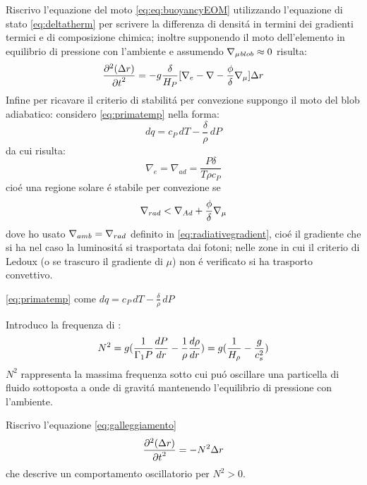 \documentclass[../main.tex]{subfiles}
\begin{document}
Riscrivo l'equazione del moto \eqref{eq:eq:buoyancyEOM} utilizzando l'equazione di stato \eqref{eq:deltatherm} per scrivere la differenza di densit\'a in termini dei gradienti termici e di composizione chimica; inoltre supponendo il moto dell'elemento in equilibrio di pressione con l'ambiente e assumendo $\nmu{}_{blob}\approx0$ risulta:
\begin{equation}
\PtwoDy{t}{(\Delta r)}=-g\frac{\delta}{H_P}[\nabla_e-\nabla-\frac{\phi}{\delta}\nmu{}]\Delta r\label{eq:galleggiamento}
\end{equation}
Infine per ricavare il criterio di stabilit\'a per convezione suppongo  il moto del blob adiabatico: considero \eqref{eq:primatemp} nella forma:
\begin{equation}
dq=c_P\,dT-\frac{\delta}{\rho}\,dP
\end{equation}
da cui risulta:
\begin{equation}
\nabla_e=\nabla_{ad}=\frac{P\delta}{T\rho c_P}
\end{equation}
cio\'e una regione solare \'e stabile per convezione se
\begin{equation}
\nrad{}<\nad+\frac{\phi}{\delta}\nmu{}\label{eq:ledoux}
\end{equation}
dove ho usato $\nabla_{amb}=\nrad{}$ definito in \eqref{eq:radiativegradient}, cio\'e il gradiente che si ha nel caso la luminosit\'a si trasportata dai fotoni; nelle zone in cui il criterio di Ledoux (o \sch{} se trascuro il gradiente di $\mu$) non \'e verificato si ha trasporto convettivo.

\begin{workout}
\eqref{eq:primatemp} come $dq=c_P\,dT-\frac{\delta}{\rho}\,dP$
\end{workout}

Introduco la frequenza di \bv{}:
\begin{equation}
N^2=g(\frac{1}{\Gamma_1P}\TDy{r}{P}-\frac{1}{\rho}\TDy{r}{\rho})=g(\frac{1}{\densityscale{}}-\frac{g}{c_s^2})\label{eq:bvfs}
\end{equation}
$N^2$ rappresenta la massima frequenza sotto cui pu\'o oscillare una particella di fluido sottoposta a onde di gravit\'a mantenendo l'equilibrio di pressione con l'ambiente.

Riscrivo l'equazione \eqref{eq:galleggiamento}
\begin{equation}
\PtwoDy{t}{(\Delta r)}=-N^2\Delta r
\end{equation}
che descrive un comportamento oscillatorio per $N^2>0$.
\end{document}
